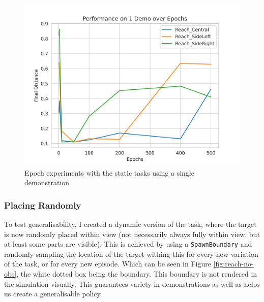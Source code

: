 \begin{figure}[htpb] %
  \centering
  \includegraphics[scale=0.5]{assets/cam-comb/reach-no-obs/rno_static.png}
  \caption{Epoch experiments with the static tasks using a single demonstration}\label{fig:rno-static}
\end{figure}

\subsubsection{Placing Randomly}
To test generalisability, I created a dynamic version of the task, where the target is now randomly placed within view (not necessarily always fully within view, but at least some parts are visible). This is achieved by using a \verb|SpawnBoundary| and randomly sampling the location of the target withing this for every new variation of the task, or for every new episode. Which can be seen in Figure \ref{fig:reach-no-obs}, the white dotted box being the boundary. This boundary is not rendered in the simulation visually. This guarantees variety in demonstrations as well as helps us create a generalisable policy.

